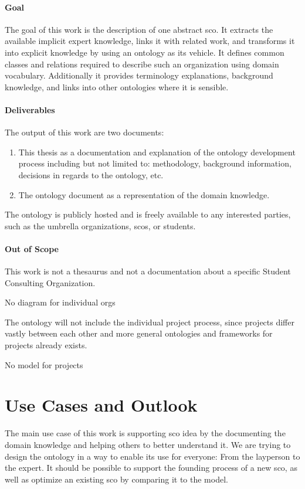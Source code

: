 \documentclass[a4paper, DIV=13, BCOR=0cm]{scrbook}
\begin{document}
\paragraph{Goal}
The goal of this work is the description of one abstract \gls{sco}. It extracts the available implicit expert knowledge, links it with related work, and transforms it into explicit  knowledge by using an ontology as its vehicle. It defines common classes and relations required to describe such an organization using domain vocabulary. Additionally it provides terminology explanations, background knowledge, and links into other ontologies where it is sensible.

\paragraph{Deliverables }
The output of this work are two documents:
\begin{enumerate}
	\item This thesis as a documentation and explanation of the ontology development process including but not limited to: methodology, background information, decisions in regards to the ontology, etc.
	\item The ontology document as a representation of the domain knowledge.
\end{enumerate}

The ontology is publicly hosted and is freely available to any interested parties, such as the umbrella organizations, \glspl{sco}, or students.

\paragraph{Out of Scope }
\begin{compactenum}
	\item This work is not a thesaurus and not a documentation about a specific Student Consulting Organization.
	\item No diagram for individual orgs
	\item The ontology will not include the individual project process, since projects differ vastly between each other and more general ontologies and frameworks for projects already exists.
	\item No model for projects
\end{compactenum}

\section{Use Cases and Outlook }
The main use case of this work is supporting \gls{sco} idea by the documenting the domain knowledge and helping others to better understand it. We are trying to design the ontology in a way to enable its use for everyone: From the layperson to the expert. It should be possible to support the founding process of a new \gls{sco}, as well as optimize an existing \gls{sco} by comparing it to the model.
\end{document}
